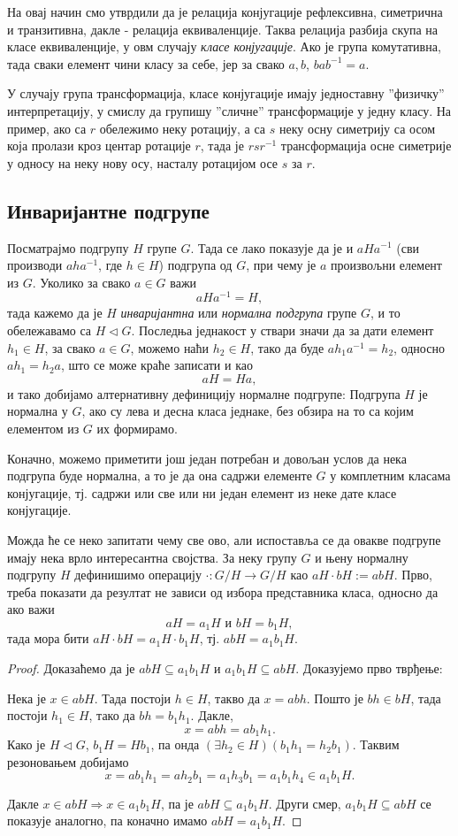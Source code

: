 \documentclass{report}
\theoremstyle{plain}
\theoremstyle{definition}
\begin{document}
На овај начин смо утврдили да је релација конјугације рефлексивна, симетрична и транзитивна, дакле - релација еквиваленције. Таква релација разбија скупа на класе еквиваленције, у овм случају \emph{класе конјугације}. Ако је група комутативна, тада сваки елемент чини класу за себе, јер за свако $a, b$, $bab^{-1} = a$.

У случају група трансформација, класе конјугације имају једноставну ''физичку'' интерпретацију, у смислу да групишу ''сличне'' трансформације у једну класу. На пример, ако са $r$ обележимо неку ротацију, а са $s$ неку осну симетрију са осом која пролази кроз центар ротације $r$, тада је $r s r^{-1}$ трансформација осне симетрије у односу на неку нову осу, насталу ротацијом осе $s$ за $r$.

\subsection{Инваријантне подгрупе}
Посматрајмо подгрупу $H$ групе $G$. Тада се лако показује да је и $aHa^{-1}$ (сви производи $aha^{-1}$, где $h\in H$) подгрупа од $G$, при чему је $a$ произвољни елемент из $G$. Уколико за свако $a\in G$ важи
$$aHa^{-1} = H,$$
тада кажемо да је $H$ \emph{инваријантна} или \emph{нормална подгрупа} групе $G$, и то обележавамо са $H\lhd G$. Последња једнакост у ствари значи да за дати елемент $h_1\in H$, за свако $a\in G$, можемо наћи $h_2\in H$, тако да буде $ah_1a^{-1} = h_2$, односно $ah_1 = h_2 a$, што се може краће записати и као
$$aH = Ha, $$
и тако добијамо алтернативну дефиницију нормалне подгрупе: Подгрупа $H$ је нормална у $G$, ако су лева и десна класа једнаке, без обзира на то са којим елементом из $G$ их формирамо.

Коначно, можемо приметити још један потребан и довољан услов да нека подгрупа буде нормална, а то је да она садржи елементе $G$ у комплетним класама конјугације, тј. садржи или све или ни један елемент из неке дате класе конјугације.

Можда ће се неко запитати чему све ово, али испоставља се да овакве подгрупе имају нека врло интересантна својства. За неку групу $G$ и њену нормалну подгрупу $H$ дефинишимо операцију $\cdot: G/H \to G/H$ као $aH\cdot bH := abH$. Прво, треба показати да резултат не зависи од избора представника класа, односно да ако важи
$$aH = a_1 H \text{ и } bH = b_1 H,$$
тада мора бити $aH\cdot bH = a_1 H \cdot b_1 H$, тј. $abH = a_1 b_1 H$.

\begin{proof}
Доказаћемо да је $abH \subseteq a_1 b_1 H$ и $a_1 b_1 H \subseteq abH$. Доказујемо прво тврђење:

Нека је $x\in abH$. Тада постоји $h\in H$, такво да $x=abh$. Пошто је $bh\in bH$, тада постоји $h_1\in H$, тако да $bh = b_1 h_1$. Дакле,
$$x = abh = ab_1 h_1.$$
Како је $H\lhd G$, $b_1 H = Hb_1$, па онда $(\exists h_2\in H)(b_1h_1=h_2b_1)$. Таквим резоновањем добијамо
$$x = ab_1h_1 = ah_2b_1 = a_1h_3b_1 = a_1b_1h_4 \in a_1b_1H.$$

Дакле $x\in abH \Rightarrow x\in a_1b_1H$, па  је $abH \subseteq a_1b_1H$. Други смер, $a_1 b_1 H \subseteq abH$ се показује аналогно, па коначно имамо $abH = a_1b_1H$.
\end{proof}
\end{document}
